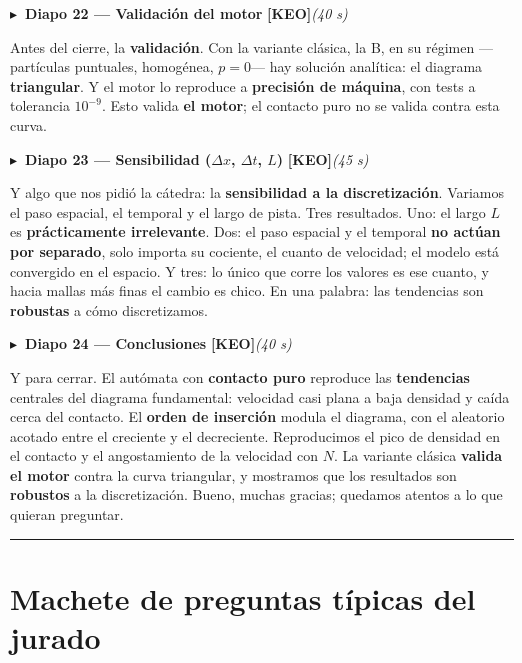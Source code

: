 \documentclass[11pt,a4paper]{article}
\newcommand{\diapo}[5]{%
  \medskip\par\noindent
  \textcolor{#4}{\textbf{$\blacktriangleright$\ Diapo #1 --- #2}}\quad
  \textcolor{#4}{\textbf{[#3]}}\hfill{\itshape\small(#5)}\par\nobreak\smallskip
}
\begin{document}
\diapo{22}{Validación del motor}{KEO}{ckeo}{40 s}
Antes del cierre, la \textbf{validación}. Con la variante clásica, la B, en su régimen ---partículas puntuales,
homogénea, $p=0$--- hay solución analítica: el diagrama \textbf{triangular}. Y el motor lo reproduce a
\textbf{precisión de máquina}, con tests a tolerancia $10^{-9}$. Esto valida \textbf{el motor}; el contacto puro
no se valida contra esta curva.

\diapo{23}{Sensibilidad ($\Delta x$, $\Delta t$, $L$)}{KEO}{ckeo}{45 s}
Y algo que nos pidió la cátedra: la \textbf{sensibilidad a la discretización}. Variamos el paso espacial, el
temporal y el largo de pista. Tres resultados. Uno: el largo $L$ es \textbf{prácticamente irrelevante}. Dos: el
paso espacial y el temporal \textbf{no actúan por separado}, solo importa su cociente, el cuanto de velocidad; el
modelo está convergido en el espacio. Y tres: lo único que corre los valores es ese cuanto, y hacia mallas más
finas el cambio es chico. En una palabra: las tendencias son \textbf{robustas} a cómo discretizamos.

\diapo{24}{Conclusiones}{KEO}{ckeo}{40 s}
Y para cerrar. El autómata con \textbf{contacto puro} reproduce las \textbf{tendencias} centrales del diagrama
fundamental: velocidad casi plana a baja densidad y caída cerca del contacto. El \textbf{orden de inserción}
modula el diagrama, con el aleatorio acotado entre el creciente y el decreciente. Reproducimos el pico de densidad
en el contacto y el angostamiento de la velocidad con $N$. La variante clásica \textbf{valida el motor} contra la
curva triangular, y mostramos que los resultados son \textbf{robustos} a la discretización. Bueno, muchas gracias;
quedamos atentos a lo que quieran preguntar.

\vspace{6pt}
\hrule
\vspace{4pt}

\section*{Machete de preguntas típicas del jurado}
\end{document}
